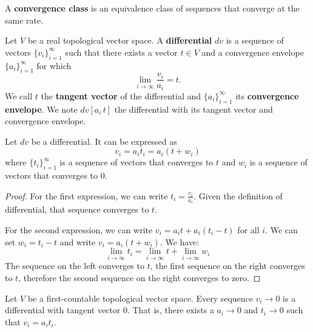 \documentclass[11pt,letterpaper,fleqn]{memoir}
\begin{document}
\begin{defn}
	A \textbf{convergence class} is an equivalence class of sequences that converge at the same rate.
\end{defn}
\fi

\begin{defn}
	Let $V$ be a real topological vector space. A \textbf{differential} $dv$ is a sequence of vectors $\{v_i\}_{i=1}^{\infty}$ such that there exists a vector $t \in V$ and a convergence envelope $\{a_i\}_{i=1}^{\infty}$ for which 
	$$ \lim\limits_{i \to \infty} \frac{v_i}{a_i} = t.$$
	We call $t$ the \textbf{tangent vector} of the differential and $\{a_i\}_{i=1}^{\infty}$ its \textbf{convergence envelope}. We note $dv[a_i \, t]$ the differential with its tangent vector and convergence envelope.
\end{defn}

\begin{prop}
	Let $dv$ be a differential. It can be expressed as
	$$ v_i = a_i t_i = a_i(t + w_i)$$
	where $\{t_i\}_{i=1}^{\infty}$ is a sequence of vectors that converges to $t$ and $w_i$ is a sequence of vectors that converges to $0$.
\end{prop}

\begin{proof}
For the first expression, we can write $t_i = \frac{v_i}{a_i}$. Given the definition of differential, that sequence converges to $t$.	
	
For the second expression, we can write $v_i = a_i t + a_i \left(t_i - t\right)$ for all $i$. We can set $w_i = t_i - t$ and write $v_i = a_i(t + w_i)$. We have:
$$\lim\limits_{i \to \infty} t_i = \lim\limits_{i \to \infty} t + \lim\limits_{i \to \infty} w_i $$
The sequence on the left converges to $t$, the first sequence on the right converges to $t$, therefore the second sequence on the right converges to zero.
\end{proof}

\begin{prop}
	Let $V$ be a first-countable topological vector space. Every sequence $v_i \to 0$ is a differential with tangent vector $0$. That is, there exists a $a_i \to 0$ and $t_i \to 0$ such that $v_i = a_i t_i$. 
\end{prop}
\end{document}

